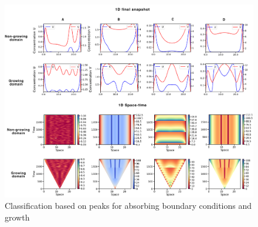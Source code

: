 \begin{figure}[H] %
    \centering
    \begin{adjustbox}{center}
        \includegraphics[width=1\textwidth]{chapters/Chapter 1/interesting_cases_edgegrowth2} %
    \end{adjustbox}
    \caption{Classification based on peaks for absorbing boundary conditions and growth}
    \label{fig:interesting_cases_edgegrowth2} %
\end{figure}




